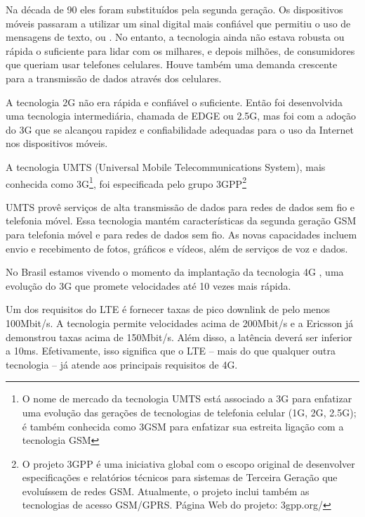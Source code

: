 Na década de 90 eles foram substituídos pela segunda geração. Os dispositivos móveis passaram a utilizar um sinal digital mais confiável que permitiu o uso de mensagens de texto, ou . No entanto, a tecnologia ainda não estava robusta ou rápida o suficiente para lidar com os milhares, e depois milhões, de consumidores que queriam usar telefones celulares. Houve também uma demanda crescente para a transmissão de dados através dos celulares.

A tecnologia 2G não era rápida e confiável o suficiente. Então foi desenvolvida uma tecnologia intermediária, chamada de EDGE ou 2.5G, mas foi com a adoção do 3G que se alcançou rapidez e confiabilidade adequadas para o uso da Internet nos dispositivos móveis.
\begin{citacao}
A tecnologia UMTS (Universal Mobile Telecommunications System), mais conhecida como 3G\footnote{O nome de mercado da tecnologia UMTS está associado a 3G para enfatizar uma evolução das gerações de tecnologias de telefonia celular (1G, 2G, 2.5G); é também conhecida como 3GSM para enfatizar sua estreita ligação com a tecnologia GSM}, foi especificada pelo grupo 3GPP\footnote{O projeto 3GPP é uma iniciativa global com o escopo original de desenvolver especificações e relatórios técnicos para sistemas de Terceira Geração que evoluíssem de redes GSM. Atualmente, o projeto inclui também as tecnologias de acesso GSM/GPRS. Página Web do projeto: 3gpp.org/}

UMTS provê serviços de alta transmissão de dados para redes de dados sem fio e telefonia móvel. Essa tecnologia mantém características da segunda geração GSM para telefonia móvel e  para redes de dados sem fio. As novas capacidades incluem envio e recebimento de fotos, gráficos e vídeos, além de serviços de voz e dados. \cite{vanni09}
\end{citacao}

No Brasil estamos vivendo o momento da implantação da tecnologia 4G , uma evolução do 3G que promete velocidades até 10 vezes mais rápida.

\begin{citacao}
Um dos requisitos do LTE é fornecer taxas de pico downlink de pelo menos 100Mbit/s. A tecnologia permite velocidades acima de 200Mbit/s e a Ericsson já demonstrou taxas acima de 150Mbit/s. Além disso, a latência  deverá ser inferior a 10ms. Efetivamente, isso significa que o LTE – mais do que qualquer outra tecnologia – já atende aos principais requisitos de 4G. \cite{teleco09}
\end{citacao}

